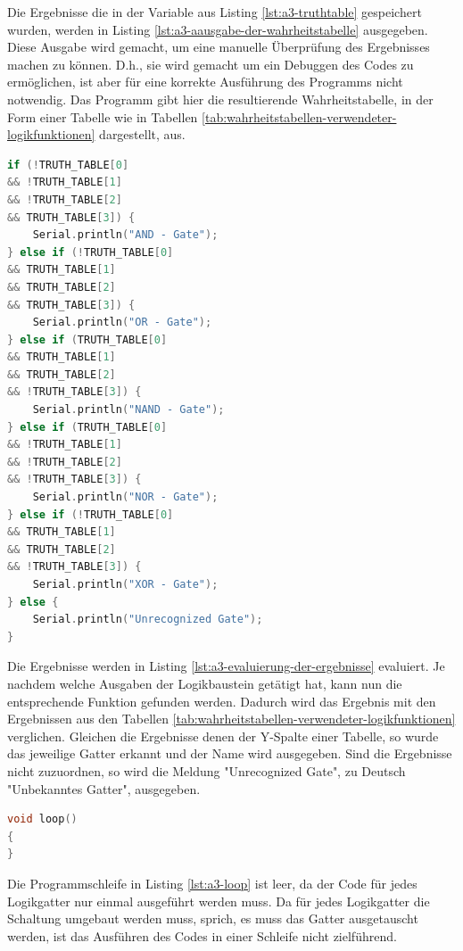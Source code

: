 Die Ergebnisse die in der Variable aus Listing \ref{lst:a3-truthtable} gespeichert wurden, werden in Listing \ref{lst:a3-aausgabe-der-wahrheitstabelle} ausgegeben.
Diese Ausgabe wird gemacht, um eine manuelle Überprüfung des Ergebnisses machen zu können.
D.h., sie wird gemacht um ein Debuggen des Codes zu ermöglichen, ist aber für eine korrekte Ausführung des Programms nicht notwendig.
Das Programm gibt hier die resultierende Wahrheitstabelle, in der Form einer Tabelle wie in Tabellen \ref{tab:wahrheitstabellen-verwendeter-logikfunktionen} dargestellt, aus.

\begin{lstlisting}[language=C,label={lst:a3-evaluierung-der-ergebnisse}, caption={Evaluierung der Ergebnisse}]
if (!TRUTH_TABLE[0]
&& !TRUTH_TABLE[1]
&& !TRUTH_TABLE[2]
&& TRUTH_TABLE[3]) {
    Serial.println("AND - Gate");
} else if (!TRUTH_TABLE[0]
&& TRUTH_TABLE[1]
&& TRUTH_TABLE[2]
&& TRUTH_TABLE[3]) {
    Serial.println("OR - Gate");
} else if (TRUTH_TABLE[0]
&& TRUTH_TABLE[1]
&& TRUTH_TABLE[2]
&& !TRUTH_TABLE[3]) {
    Serial.println("NAND - Gate");
} else if (TRUTH_TABLE[0]
&& !TRUTH_TABLE[1]
&& !TRUTH_TABLE[2]
&& !TRUTH_TABLE[3]) {
    Serial.println("NOR - Gate");
} else if (!TRUTH_TABLE[0]
&& TRUTH_TABLE[1]
&& TRUTH_TABLE[2]
&& !TRUTH_TABLE[3]) {
    Serial.println("XOR - Gate");
} else {
    Serial.println("Unrecognized Gate");
}
\end{lstlisting}

Die Ergebnisse werden in Listing \ref{lst:a3-evaluierung-der-ergebnisse} evaluiert.
Je nachdem welche Ausgaben der Logikbaustein getätigt hat, kann nun die entsprechende Funktion gefunden werden.
Dadurch wird das Ergebnis mit den Ergebnissen aus den Tabellen \ref{tab:wahrheitstabellen-verwendeter-logikfunktionen} verglichen.
Gleichen die Ergebnisse denen der Y-Spalte einer Tabelle, so wurde das jeweilige Gatter erkannt und der Name wird ausgegeben.
Sind die Ergebnisse nicht zuzuordnen, so wird die Meldung "Unrecognized Gate", zu Deutsch "Unbekanntes Gatter", ausgegeben.

\begin{lstlisting}[language=C,label={lst:a3-loop}, caption={Programmschleife}]
void loop()
{
}
\end{lstlisting}

Die Programmschleife in Listing \ref{lst:a3-loop} ist leer, da der Code für jedes Logikgatter nur einmal ausgeführt werden muss.
Da für jedes Logikgatter die Schaltung umgebaut werden muss, sprich, es muss das Gatter ausgetauscht werden, ist das Ausführen  des Codes in einer Schleife nicht zielführend.

